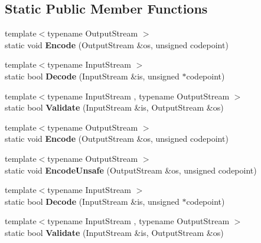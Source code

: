 \subsection*{Static Public Member Functions}
\begin{DoxyCompactItemize}
\item 
\mbox{\label{structUTF32_a511d1b09672ce535085895a28d8c2f13}} 
{\footnotesize template$<$typename Output\+Stream $>$ }\\static void {\bfseries Encode} (Output\+Stream \&os, unsigned codepoint)
\item 
\mbox{\label{structUTF32_a6e7258a5e982e101345dffdc355e9b53}} 
{\footnotesize template$<$typename Input\+Stream $>$ }\\static bool {\bfseries Decode} (Input\+Stream \&is, unsigned $\ast$codepoint)
\item 
\mbox{\label{structUTF32_a71336fb0546b3079e01bbd51d2fa2e45}} 
{\footnotesize template$<$typename Input\+Stream , typename Output\+Stream $>$ }\\static bool {\bfseries Validate} (Input\+Stream \&is, Output\+Stream \&os)
\item 
\mbox{\label{structUTF32_a511d1b09672ce535085895a28d8c2f13}} 
{\footnotesize template$<$typename Output\+Stream $>$ }\\static void {\bfseries Encode} (Output\+Stream \&os, unsigned codepoint)
\item 
\mbox{\label{structUTF32_ae50dd8dff92c36ee184c6d4eccb1961e}} 
{\footnotesize template$<$typename Output\+Stream $>$ }\\static void {\bfseries Encode\+Unsafe} (Output\+Stream \&os, unsigned codepoint)
\item 
\mbox{\label{structUTF32_a6e7258a5e982e101345dffdc355e9b53}} 
{\footnotesize template$<$typename Input\+Stream $>$ }\\static bool {\bfseries Decode} (Input\+Stream \&is, unsigned $\ast$codepoint)
\item 
\mbox{\label{structUTF32_a71336fb0546b3079e01bbd51d2fa2e45}} 
{\footnotesize template$<$typename Input\+Stream , typename Output\+Stream $>$ }\\static bool {\bfseries Validate} (Input\+Stream \&is, Output\+Stream \&os)
\end{DoxyCompactItemize}


